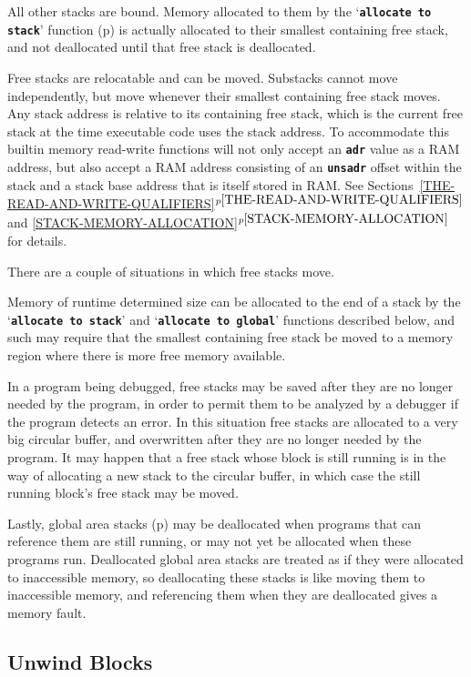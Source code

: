 \documentclass[12pt]{article}
\newcommand{\TT}[1]{{\tt \bfseries #1}}
\newcommand{\itemref}[1]{\ref{#1}$^{p\pageref{#1}}$}
\newcommand{\pagref}[1]{p\pageref{#1}}
\begin{document}
All other stacks are bound.  Memory allocated to them
by the `\TT{allocate to stack}' function (\pagref{ALLOCATE-TO-STACK})
is actually
allocated to their smallest containing free stack, and not deallocated
until that free stack is deallocated.

Free stacks are relocatable and can be moved.
Substacks cannot move independently,
but move whenever their smallest containing free stack moves.
Any stack address is relative to its containing free stack,
which is the current free stack at the time executable code uses
the stack address.  To accommodate this builtin memory read-write
functions will not only accept an \TT{adr} value as a RAM address,
but also accept a RAM address consisting of an \TT{unsadr}
offset within the stack and a stack base address that is itself
stored in RAM.  See Sections~\itemref{THE-READ-AND-WRITE-QUALIFIERS}
and \itemref{STACK-MEMORY-ALLOCATION}
for details.

There are a couple of situations in which free stacks move.

Memory of runtime determined size can be allocated to the end of
a stack by the `\TT{allocate to stack}' and `\TT{allocate to global}'
functions described below, and such may
require that the smallest containing free stack
be moved to a memory region where there is more free memory available.

In a program being debugged, free stacks may be saved after they are no
longer needed by the program, in order to permit them to be analyzed
by a debugger if the program detects an error.  In this situation
free stacks are allocated to a very big circular buffer, and overwritten
after they are no longer needed by the program.  It may happen that
a free stack whose block is still running is in the way of allocating
a new stack to the circular buffer, in which case the still running
block's free stack may be moved.

Lastly, global area stacks (\pagref{GLOBAL-AREAS})
may be deallocated when programs that
can reference them are still running, or may not yet be allocated
when these programs run.  Deallocated global area stacks are treated as if
they were allocated to inaccessible memory, so deallocating these stacks
is like moving them to inaccessible memory, and referencing
them when they are deallocated gives a memory fault.


\subsection{Unwind Blocks}
\label{UNWIND-BLOCKS}
\end{document}
